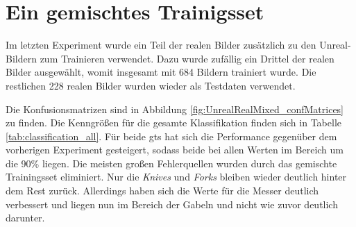 \section{Ein gemischtes Trainigsset}
\label{unrealrealmixed}

Im letzten Experiment wurde ein Teil der realen Bilder zusätzlich zu den Unreal-Bildern zum Trainieren verwendet. Dazu wurde zufällig ein Drittel der realen Bilder ausgewählt, womit insgesamt mit 684 Bildern trainiert wurde. Die restlichen 228 realen Bilder wurden wieder als Testdaten verwendet. \par

Die Konfusionsmatrizen sind in Abbildung \ref{fig:UnrealRealMixed_confMatrices} zu finden. Die Kenngrößen für die gesamte Klassifikation finden sich in Tabelle \ref{tab:classification_all}. Für beide \gls{gt}s hat sich die Performance gegenüber dem vorherigen Experiment gesteigert, sodass beide bei allen Werten im Bereich um die 90\% liegen. Die meisten großen Fehlerquellen wurden durch das gemischte Trainingsset eliminiert. Nur die \textit{Knives} und \textit{Forks} bleiben wieder deutlich hinter dem Rest zurück. Allerdings haben sich die Werte für die Messer deutlich verbessert und liegen nun im Bereich der Gabeln und nicht wie zuvor deutlich darunter.  \par 

